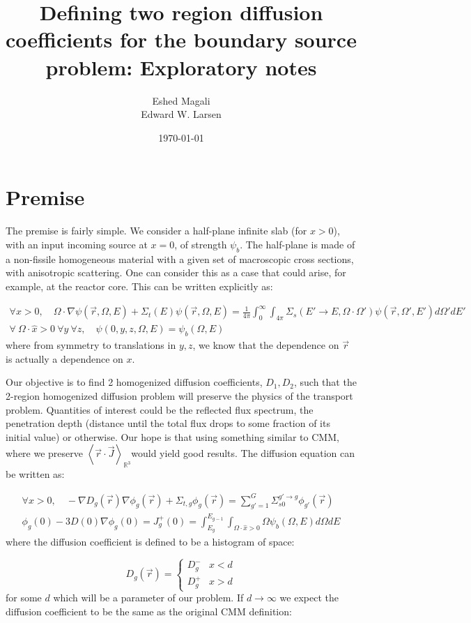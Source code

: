 \documentclass[a4paper,letterpaper,12pt,oneside,draft]{article}
\title{Defining two region diffusion coefficients for the boundary source problem: Exploratory notes}
\author{Eshed Magali \\ Edward W. Larsen}
\date{\today}
\newcommand{\allspace}{\ensuremath{\mathbb{R}^3}}
\newcommand{\bracket}[1]{\ensuremath{\left\langle #1 \right\rangle}}
\newcommand{\bracketR}[1]{\ensuremath{\bracket{#1}_{\allspace}}}
\newcommand{\rdotJ}{\bracketR{\vec{r}\cdot\vec{J}}}
\newcommand{\intg}[2][g]{\ensuremath{\int_{E_{#1}}^{E_{#1-1}} #2 dE}}
\newcommand{\vr}{\ensuremath{\vec{r}}}
\newcommand{\psif}[1][]{\psi(\vr,\Omega#1,E#1)}
\begin{document}
\maketitle
\section{Premise}
    The premise is fairly simple. We consider a half-plane infinite slab (for $x>0$), with an input incoming source at $x=0$, of strength $\psi_b$. The half-plane is made of a non-fissile homogeneous material with a given set of macroscopic cross sections, with anisotropic scattering. One can consider this as a case that could arise, for example, at the reactor core. This can be written explicitly as:
    
    \begin{gather}
    \label{eq:BTE}
        \forall x>0,\quad \Omega\cdot\nabla\psif + \Sigma_t(E)\psif = \frac{1}{4\pi}\int_0^\infty\int_{4\pi}\Sigma_{s}(E'\to E,\Omega\cdot\Omega')\psif[']d\Omega'dE' \\
    \label{eq:BTE:BC}
        \forall\  \Omega\cdot\hat{x}>0\  \forall y\  \forall z, \quad 
        \psi(0,y,z,\Omega,E) = \psi_b(\Omega,E)
    \end{gather}
    where from symmetry to translations in $y,z$, we know that the dependence on $\vr$ is actually a dependence on $x$.
    
    Our objective is to find 2 homogenized diffusion coefficients, $D_1,D_2$, such that the 2-region homogenized diffusion problem will preserve the physics of the transport problem. Quantities of interest could be the reflected flux spectrum, the penetration depth (distance until the total flux drops to some fraction of its initial value) or otherwise. Our hope is that using something similar to CMM, where we preserve \rdotJ would yield good results. The diffusion equation can be written as:
    
    \begin{gather}
    \label{eq:Diff}
        \forall x>0, \quad-\nabla D_g(\vr)\nabla\phi_g(\vr) + \Sigma_{t,g}\phi_g(\vr) = \sum_{g'=1}^G\Sigma_{s0}^{g'\to g}\phi_{g'}(\vr) \\
    \label{eq:Diff:BC}
        \phi_g(0) - 3D(0)\nabla\phi_g(0) = J^+_g(0) = \intg{\int_{\Omega\cdot\hat{x}>0}\Omega\psi_b(\Omega,E)d\Omega}
    \end{gather}
    where the diffusion coefficient is defined to be a histogram of space:
    
    \begin{equation}
    \label{eq:DiffCoeff:heavyside}
        D_g(\vr) = 
        \begin{cases}
            D_g^- & x < d \\
            D_g^+ & x > d
        \end{cases}
    \end{equation}
    for some $d$ which will be a parameter of our problem. If $d\to\infty$ we expect the diffusion coefficient to be the same as the original CMM definition:
    
\end{document}
